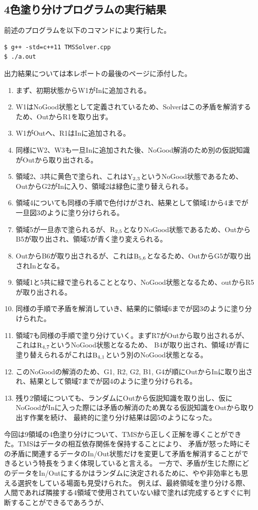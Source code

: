 \documentclass[uplatex]{jsarticle}
\begin{document}
\subsection{4色塗り分けプログラムの実行結果}
前述のプログラムを以下のコマンドにより実行した。
\begin{lstlisting}[basicstyle=\ttfamily\footnotesize, frame=single]
$ g++ -std=c++11 TMSSolver.cpp
$ ./a.out
\end{lstlisting}
出力結果については本レポートの最後のページに添付した。

\begin{enumerate}
  \item まず、初期状態からW1がInに追加される。
  \item W1はNoGood状態として定義されているため、Solverはこの矛盾を解消するため、OutからR1を取り出す。
  \item W1がOutへ、R1はInに追加される。
  \item 同様にW2、W3も一旦Inに追加された後、NoGood解消のため別の仮説知識がOutから取り出される。
  \item 領域2、3共に黄色で塗られ、これは$\rm{Y}_{2,3}$というNoGood状態であるため、
  OutからG2がInに入り、領域2は緑色に塗り替えられる。
  \item 領域4についても同様の手順で色付けがされ、結果として領域1から4までが一旦図3のように塗り分けられる。
  \item 領域5が一旦赤で塗られるが、$\rm{R}_{2,5}$となりNoGood状態であるため、OutからB5が取り出され、領域5が青く塗り変えられる。
  \item OutからB6が取り出されるが、これは$\rm{B}_{5,6}$となるため、OutからG5が取り出されInとなる。
  \item 領域1と5共に緑で塗られることとなり、NoGood状態となるため、outからR5が取り出される。
  \item 同様の手順で矛盾を解消していき、結果的に領域6までが図3のように塗り分けられた。
  \item 領域7も同様の手順で塗り分けていく。まずR7がOutから取り出されるが、これは$\rm{R}_{4,7}$というNoGood状態となるため、
  B4が取り出され、領域4が青に塗り替えられるがこれは$\rm{B}_{4,1}$という別のNoGood状態となる。
  \item このNoGoodの解消のため、G1, R2, G2, B1, G4が順にOutからInに取り出され、結果として領域7までが図4のように塗り分けられる。
  \item 残り2領域についても、ランダムにOutから仮説知識を取り出し、仮にNoGoodがInに入った際には矛盾の解消のため異なる仮説知識をOutから取り出す作業を続け、
  最終的に塗り分け結果は図5のようになった。
\end{enumerate}
今回は9領域の4色塗り分けについて、TMSから正しく正解を導くことができた。TMSはデータの相互依存関係を保持することにより、
矛盾が怒った時にその矛盾に関連するデータのIn/Out状態だけを変更して矛盾を解消することができるという特長をうまく体現していると言える。
一方で、矛盾が生じた際にどのデータをIn/Outにするかはランダムに決定されるために、やや非効率とも思える選択をしている場面も見受けられた。
例えば、最終領域を塗り分ける際、人間であれば隣接する4領域で使用されていない緑で塗れば完成するとすぐに判断することができるであろうが、
\end{document}
